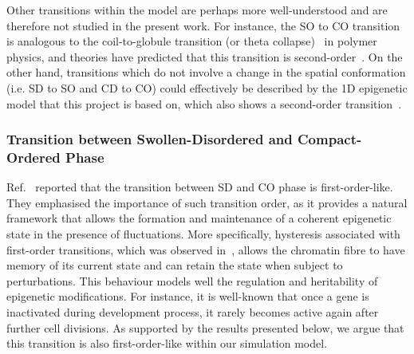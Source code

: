 \documentclass[12pt]{article}
\begin{document}
Other transitions within the model are perhaps more well-understood and are therefore not studied in the present work. For instance, the SO to CO transition is analogous to the coil-to-globule transition (or theta collapse)~\cite{polymerbook} in polymer physics, and theories have predicted that this transition is second-order~\cite{moore1977, sanchez1979}. On the other hand, transitions which do not involve a change in the spatial conformation (i.e. SD to SO and CD to CO) could effectively be described by the 1D epigenetic model that this project is based on, which also shows a second-order transition~\cite{dodd2007}.

\subsubsection{Transition between Swollen-Disordered and Compact-Ordered Phase}
Ref.~\cite{michieletto2016} reported that the transition between SD and CO phase is first-order-like. They emphasised the importance of such transition order, as it provides a natural framework that allows the formation and maintenance of a coherent epigenetic state in the presence of fluctuations. More specifically, hysteresis associated with first-order transitions, which was observed in~\cite{michieletto2016},  allows the chromatin fibre to have memory of its current state and can retain the state when subject to perturbations. This behaviour models well the regulation and heritability of epigenetic modifications. For instance, it is well-known that once a gene is inactivated during development process, it rarely becomes active again after further cell divisions. As supported by the results presented below, we argue that this transition is also first-order-like within our simulation model.
\end{document}
